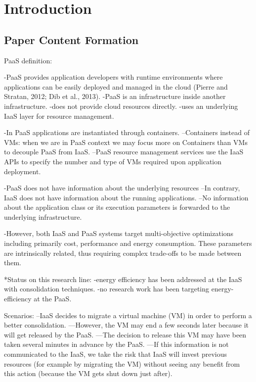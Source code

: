 \section{Introduction}
\label{sec: intro}

\subsection{Paper Content Formation}
PaaS definition:

-PaaS provides application developers with runtime environments where applications can be easily deployed and managed in the cloud (Pierre and Stratan, 2012; Dib et al., 2013).
-PaaS is an infrastructure inside another infrastructure.
-does not provide cloud resources directly.
-uses an underlying IaaS layer for resource management.

-In PaaS applications are instantiated through containers.
--Containers instead of VMs: when we are in PaaS context we may focus more on Containers than VMs to decouple PaaS from IaaS.
--PaaS resource management services use the IaaS APIs to specify the number and type of VMs required upon application deployment.

-PaaS does not have information about the underlying resources
--In contrary, IaaS does not have information about the running applications.
--No information about the application class or its execution parameters is forwarded to the underlying infrastructure.


-However, both IaaS and PaaS systems target multi-objective optimizations including primarily cost, performance and energy consumption. These parameters are intrinsically related, thus requiring complex trade-offs to be made between them.

*Status on this research line:
-energy efficiency has been addressed at the IaaS with consolidation techniques.
-no research work has been targeting energy-efficiency at the PaaS.

Scenarios: 
--IaaS decides to migrate a virtual machine (VM) in order to perform a better consolidation.
---However, the VM may end a few seconds later because it will get released by the PaaS.
---The decision to release this VM may have been taken several minutes in advance by the PaaS.
---If this information is not communicated to the IaaS, we take the risk that IaaS will invest previous resources (for example by migrating the VM) without seeing any benefit from this action (because the VM gets shut down just after).

